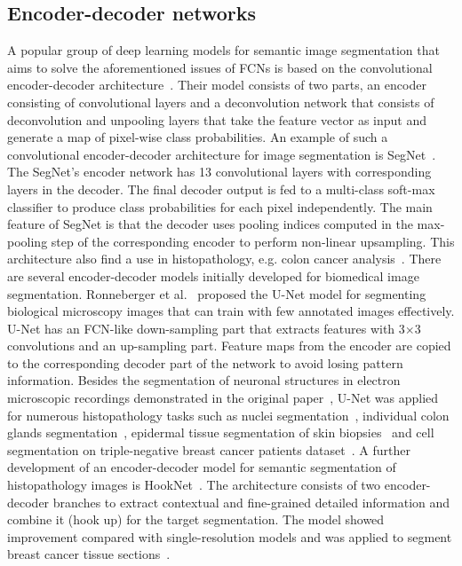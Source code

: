 \subsection{Encoder-decoder networks}
A popular group of deep learning models for semantic image segmentation that aims to solve the
aforementioned issues of FCNs is based on the convolutional encoder-decoder architecture~\cite{noh2015learning}.
Their model consists of two parts, an encoder consisting of convolutional layers and a deconvolution
network that consists of deconvolution and unpooling layers that take the feature vector as input
and generate a map of pixel-wise class probabilities. An example of such a convolutional encoder-decoder
architecture for image segmentation is SegNet~\cite{badrinarayanan2017segnet}. The SegNet's encoder
network has 13 convolutional layers with corresponding layers in the decoder. The final decoder output
is fed to a multi-class soft-max classifier to produce class probabilities for each pixel independently.
The main feature of SegNet is that the decoder uses pooling indices computed in the max-pooling step
of the corresponding encoder to perform non-linear upsampling. This architecture also find a use in
histopathology, e.g. colon cancer analysis~\cite{hamida2021deep}. There are several encoder-decoder models
initially developed for biomedical image segmentation. Ronneberger et al.~\cite{10.1007/978-3-319-24574-4_28}
proposed the U-Net model for segmenting biological microscopy images that can train with few annotated
images effectively. U-Net has an FCN-like down-sampling part that extracts features with 3$\times$3
convolutions and an up-sampling part. Feature maps from the encoder are copied to the corresponding
decoder part of the network to avoid losing pattern information. Besides the segmentation of neuronal
structures in electron microscopic recordings demonstrated in the original paper~\cite{10.1007/978-3-319-24574-4_28},
U-Net was applied for numerous histopathology tasks such as nuclei segmentation~\cite{lagree2021review, zeng2019ric},
individual colon glands segmentation~\cite{pinckaers2019neural}, epidermal tissue segmentation of skin biopsies~\cite{oskal2019u}
and cell segmentation on triple-negative breast cancer patients dataset~\cite{bagdigen2020cell}.
A further development of an encoder-decoder model for semantic segmentation of histopathology images
is HookNet~\cite{van2021hooknet}. The architecture consists of two encoder-decoder branches to extract
contextual and fine-grained detailed information and combine it (hook up) for the target segmentation.
The model showed improvement compared with single-resolution models and was applied to segment
breast cancer tissue sections~\cite{van2021hooknet}.

